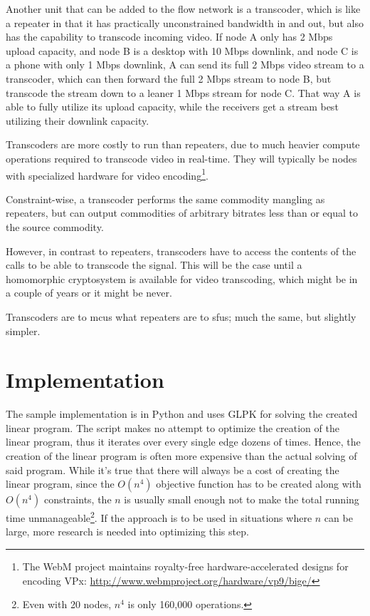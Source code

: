 Another unit that can be added to the flow network is a transcoder, which is like a repeater in that it has practically unconstrained bandwidth in and out, but also has the capability to transcode incoming video. If node A only has 2 Mbps upload capacity, and node B is a desktop with 10 Mbps downlink, and node C is a phone with only 1 Mbps downlink, A can send its full 2 Mbps video stream to a transcoder, which can then forward the full 2 Mbps stream to node B, but transcode the stream down to a leaner 1 Mbps stream for node C. That way A is able to fully utilize its upload capacity, while the receivers get a stream best utilizing their downlink capacity.

Transcoders are more costly to run than repeaters, due to much heavier compute operations required to transcode video in real-time. They will typically be nodes with specialized hardware for video encoding\footnote{The WebM project maintains royalty-free hardware-accelerated designs for encoding VPx: \url{http://www.webmproject.org/hardware/vp9/bige/}}.

Constraint-wise, a transcoder performs the same commodity mangling as repeaters, but can output commodities of arbitrary bitrates less than or equal to the source commodity.

However, in contrast to repeaters, transcoders have to access the contents of the calls to be able to transcode the signal. This will be the case until a homomorphic cryptosystem is available for video transcoding, which might be in a couple of years or it might be never.

Transcoders are to \glspl{mcu} what repeaters are to \glspl{sfu}; much the same, but slightly simpler.


\section{Implementation}\label{sec:implementation}

The sample implementation is in Python and uses GLPK for solving the created linear program. The script makes no attempt to optimize the creation of the linear program, thus it iterates over every single edge dozens of times. Hence, the creation of the linear program is often more expensive than the actual solving of said program. While it's true that there will always be a cost of creating the linear program, since the $O(n^4)$ objective function has to be created along with $O(n^4)$ constraints, the $n$ is usually small enough not to make the total running time unmanageable\footnote{Even with 20 nodes, $n^4$ is only 160,000 operations.}. If the approach is to be used in situations where $n$ can be large, more research is needed into optimizing this step.

